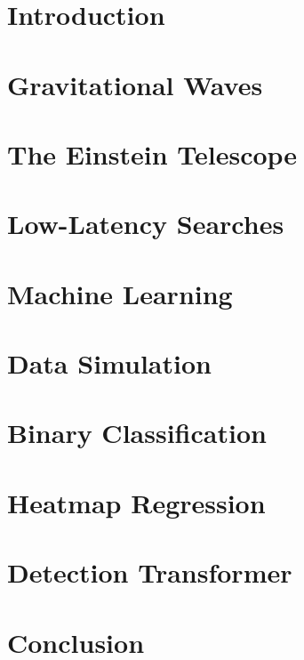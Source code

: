 \documentclass[12pt,a4paper,titlepage,twoside,openright]{report}
\begin{document}
\sloppy
{}





\tableofcontents

\chapter{Introduction}
\setcounter{page}{1}
\begingroup

\endgroup

\chapter{Gravitational Waves} 
\label{sec:gravitational_waves}


\chapter{The Einstein Telescope}
\label{sec:einstein_telescope}


\chapter{Low-Latency Searches}
\label{sec:matched_filtering}


\chapter{Machine Learning}
\label{sec:machine_learning}


\chapter{Data Simulation}
\label{sec:data_simulation}


\chapter{Binary Classification}
\label{sec:long_duration}


\chapter{Heatmap Regression}
\label{sec:heatmap}


\chapter{Detection Transformer}
\label{sec:detr}


\chapter{Conclusion}
\label{sec:conclusion}


\printbibliography

\appendix

\end{document}
